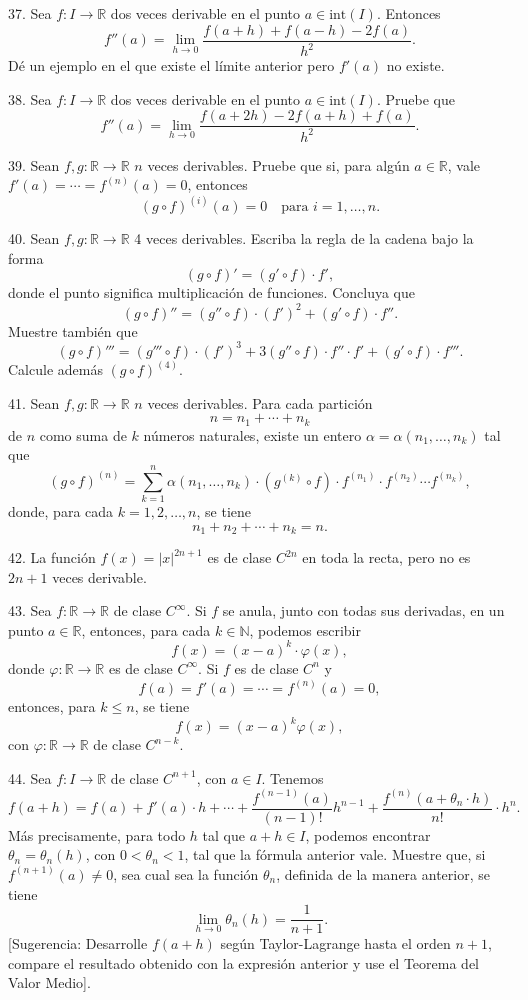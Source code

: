 \documentclass[12pt,oneside]{book}
\begin{document}
37. Sea \( f: I \to \mathbb{R} \) dos veces derivable en el punto \( a \in \text{int}(I) \). Entonces
\[
f''(a) = \lim_{h \to 0} \frac{f(a+h) + f(a-h) - 2f(a)}{h^2}.
\]
Dé un ejemplo en el que existe el límite anterior pero \( f'(a) \) no existe.

38. Sea \( f: I \to \mathbb{R} \) dos veces derivable en el punto \( a \in \text{int}(I) \). Pruebe que
\[
f''(a) = \lim_{h \to 0} \frac{f(a+2h) - 2f(a+h) + f(a)}{h^2}.
\]

39. Sean \( f, g: \mathbb{R} \to \mathbb{R} \) \( n \) veces derivables. Pruebe que si, para algún \( a \in \mathbb{R} \), vale \( f'(a) = \cdots = f^{(n)}(a) = 0 \), entonces
\[
(g \circ f)^{(i)}(a) = 0 \quad \text{para } i = 1, \ldots, n.
\]

40. Sean \( f, g: \mathbb{R} \to \mathbb{R} \) 4 veces derivables. Escriba la regla de la cadena bajo la forma
\[
(g \circ f)' = (g' \circ f) \cdot f',
\]
donde el punto significa multiplicación de funciones. Concluya que
\[
(g \circ f)'' = (g'' \circ f) \cdot (f')^2 + (g' \circ f) \cdot f''.
\]
Muestre también que
\[
(g \circ f)''' = (g''' \circ f) \cdot (f')^3 + 3(g'' \circ f) \cdot f'' \cdot f' + (g' \circ f) \cdot f'''.
\]
Calcule además \( (g \circ f)^{(4)} \).

41. Sean \( f, g: \mathbb{R} \to \mathbb{R} \) \( n \) veces derivables. Para cada partición
\[
n = n_1 + \cdots + n_k
\]
de \( n \) como suma de \( k \) números naturales, existe un entero \( \alpha = \alpha(n_1, \ldots, n_k) \) tal que
\[
(g \circ f)^{(n)} = \sum_{k=1}^{n} \alpha(n_1, \ldots, n_k) \cdot (g^{(k)} \circ f) \cdot f^{(n_1)} \cdot f^{(n_2)} \cdots f^{(n_k)},
\]
donde, para cada \( k = 1, 2, \ldots, n \), se tiene
\[
n_1 + n_2 + \cdots + n_k = n.
\]

42. La función \( f(x) = |x|^{2n+1} \) es de clase \( C^{2n} \) en toda la recta, pero no es \( 2n+1 \) veces derivable.

43. Sea \( f: \mathbb{R} \to \mathbb{R} \) de clase \( C^\infty \). Si \( f \) se anula, junto con todas sus derivadas, en un punto \( a \in \mathbb{R} \), entonces, para cada \( k \in \mathbb{N} \), podemos escribir
\[
f(x) = (x-a)^k \cdot \varphi(x),
\]
donde \( \varphi: \mathbb{R} \to \mathbb{R} \) es de clase \( C^\infty \). Si \( f \) es de clase \( C^n \) y
\[
f(a) = f'(a) = \cdots = f^{(n)}(a) = 0,
\]
entonces, para \( k \leq n \), se tiene
\[
f(x) = (x-a)^k \varphi(x),
\]
con \( \varphi: \mathbb{R} \to \mathbb{R} \) de clase \( C^{n-k} \).

44. Sea \( f: I \to \mathbb{R} \) de clase \( C^{n+1} \), con \( a \in I \). Tenemos
\[
f(a+h) = f(a) + f'(a) \cdot h + \cdots + \frac{f^{(n-1)}(a)}{(n-1)!}h^{n-1} + \frac{f^{(n)}(a+\theta_n \cdot h)}{n!} \cdot h^n.
\]
Más precisamente, para todo \( h \) tal que \( a+h \in I \), podemos encontrar \( \theta_n = \theta_n(h) \), con \( 0 < \theta_n < 1 \), tal que la fórmula anterior vale. Muestre que, si \( f^{(n+1)}(a) \neq 0 \), sea cual sea la función \( \theta_n \), definida de la manera anterior, se tiene
\[
\lim_{h \to 0} \theta_n(h) = \frac{1}{n+1}.
\]
[Sugerencia: Desarrolle \( f(a+h) \) según Taylor-Lagrange hasta el orden \( n+1 \), compare el resultado obtenido con la expresión anterior y use el Teorema del Valor Medio].
\end{document}
